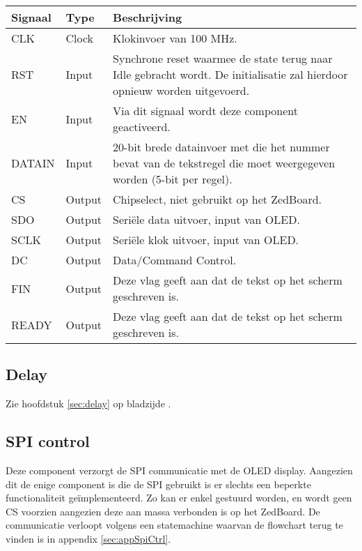 			\begin{table}[H]
				\begin{tabular}{p{} p{} p{}}
					\toprule
					\textbf{Signaal} & \textbf{Type} & \textbf{Beschrijving} \\
					\midrule
					CLK & Clock & Klokinvoer van 100 MHz. \\
					RST & Input & Synchrone reset waarmee de state terug naar Idle gebracht wordt. De initialisatie zal hierdoor opnieuw worden uitgevoerd. \\
					EN & Input & Via dit signaal wordt deze component geactiveerd. \\
					DATA\textunderscore IN & Input & 20-bit brede datainvoer met die het nummer bevat van de tekstregel die moet weergegeven worden (5-bit per regel). \\
					CS & Output & Chipselect, niet gebruikt op het ZedBoard. \\
					SDO & Output & Seri\"ele data uitvoer, input van OLED. \\
					SCLK & Output & Seri\"ele klok uitvoer, input van OLED. \\
					DC & Output & Data/Command Control. \\
					FIN & Output & Deze vlag geeft aan dat de tekst op het scherm geschreven is. \\
					READY & Output & Deze vlag geeft aan dat de tekst op het scherm geschreven is. \\
					\bottomrule 
				\end{tabular} 
			\end{table}

 	\subsection{Delay}

 		\par Zie hoofdstuk \ref{sec:delay} op bladzijde \pageref{sec:delay}.

\newpage

 	\subsection{SPI control}

 		\par Deze component verzorgt de SPI communicatie met de OLED display. Aangezien dit de enige component is die de SPI gebruikt is er slechts een beperkte functionaliteit ge\"implementeerd.	Zo kan er enkel gestuurd worden, en wordt geen CS voorzien aangezien deze aan massa verbonden is op het ZedBoard. De communicatie verloopt volgens een statemachine waarvan de flowchart terug te vinden is in appendix \ref{sec:appSpiCtrl}.

